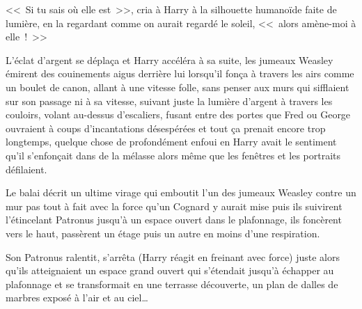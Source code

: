 <<~Si tu sais où elle est~>>, cria à Harry à la silhouette humanoïde faite de lumière, en la regardant comme on aurait regardé le soleil, <<~alors amène-moi à elle~!~>>

L'éclat d'argent se déplaça et Harry accéléra à sa suite, les jumeaux Weasley émirent des couinements aigus derrière lui lorsqu'il fonça à travers les airs comme un boulet de canon, allant à une vitesse folle, sans penser aux murs qui sifflaient sur son passage ni à sa vitesse, suivant juste la lumière d'argent à travers les couloirs, volant au-dessus d'escaliers, fusant entre des portes que Fred ou George ouvraient à coups d'incantations désespérées et tout ça prenait encore trop longtemps, quelque chose de profondément enfoui en Harry avait le sentiment qu'il s'enfonçait dans de la mélasse alors même que les fenêtres et les portraits défilaient.

Le balai décrit un ultime virage qui emboutit l'un des jumeaux Weasley contre un mur pas tout à fait avec la force qu'un Cognard y aurait mise puis ils suivirent l'étincelant Patronus jusqu'à un espace ouvert dans le plafonnage, ils foncèrent vers le haut, passèrent un étage puis un autre en moins d'une respiration.

Son Patronus ralentit, s'arrêta (Harry réagit en freinant avec force) juste alors qu'ils atteignaient un espace grand ouvert qui s'étendait jusqu'à échapper au plafonnage et se transformait en une terrasse découverte, un plan de dalles de marbres exposé à l'air et au ciel…
